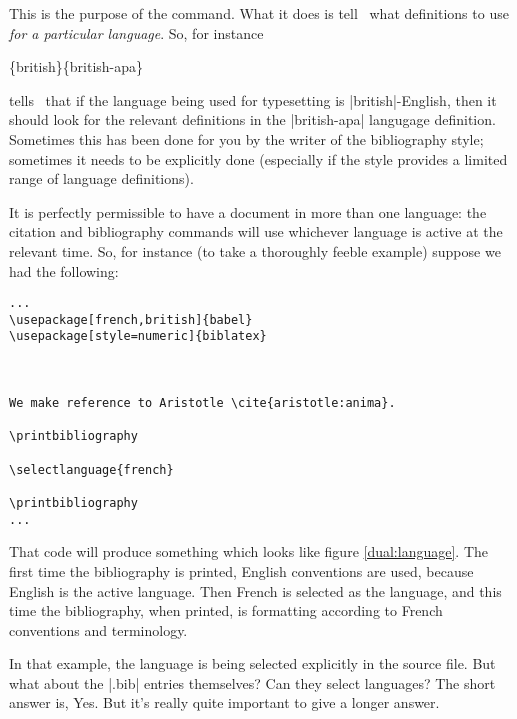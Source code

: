 This is the purpose of the  command. What
it does is tell \biblatex\ what definitions to use \emph{for a
  particular language}. So, for instance
\begin{pseudoverb}
  \{british\}\{british-apa\}
\end{pseudoverb}
tells \biblatex\ that if the language being used for typesetting is
|british|-English, then it should look for the relevant definitions in
the |british-apa| langugage definition. Sometimes this has been done
for you by the writer of the bibliography style; sometimes it needs to
be explicitly done (especially if the style provides a limited range
of language definitions).

It is perfectly permissible to have a document in more than one
language: the citation and bibliography commands will use whichever
language is active at the relevant time. So, for instance (to take a
thoroughly feeble example) suppose we had the following:

\begin{Verbatim}[frame=single]
...
\usepackage[french,british]{babel}
\usepackage[style=numeric]{biblatex}



We make reference to Aristotle \cite{aristotle:anima}.

\printbibliography

\selectlanguage{french}

\printbibliography
...
\end{Verbatim}

\begin{figure*}
\vspace{3pt}%
\caption{A document using two languages\label{dual:language}}
\end{figure*}

That code will produce something which looks like figure
\ref{dual:language}. The first time the bibliography is printed,
English conventions are used, because English is the active
language. Then French is selected as the language, and this time the
bibliography, when printed, is formatting according to French
conventions and terminology.

In that example, the language is being selected explicitly in the
source file. But what about the |.bib| entries themselves? Can they
select languages? The short answer is, Yes. But it's really quite
important to give a longer answer.


